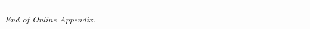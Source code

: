 \documentclass[12pt, a4paper]{article}
\begin{document}


\vspace{2em}
\hrule
\vspace{1em}

\noindent\textit{End of Online Appendix.}
\end{document}
